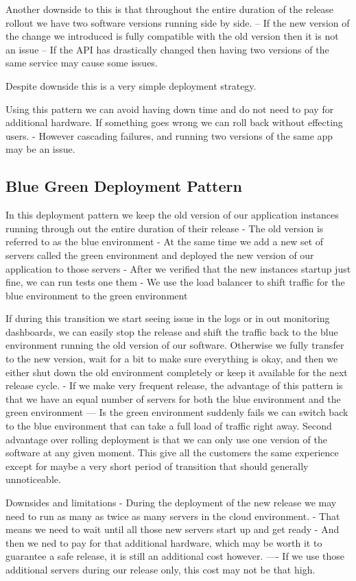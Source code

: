 Another downside to this is that throughout the entire duration of the release rollout we have two software versions running side by side.
-- If the new version of the change we introduced is fully compatible with the old version then it is not an issue
-- If the API has drastically changed then having two versions of the same service may cause some issues.

Despite downside this is a very simple deployment strategy.

Using this pattern we can avoid having down time and do not need to pay for additional hardware.
If something goes wrong we can roll back without effecting users.
- However cascading failures, and running two versions of the same app may be an issue.

\subsection{Blue Green Deployment Pattern}
In this deployment pattern we keep the old version of our application instances running through out the entire duration of their release
- The old version is referred to as the blue environment
- At the same time we add a new set of servers called the green environment and deployed the new version of our application to those servers
- After we verified that the new instances startup just fine, we can run tests one them
- We use the load balancer to shift traffic for the blue environment to the green environment

If during this transition we start seeing issue in the logs or in out monitoring dashboards, we can easily stop the release and shift the traffic back to the blue environment running the old version of our software.
Otherwise we fully transfer to the new version, wait for a bit to make sure everything is okay, and then we either shut down the old environment completely or keep it available for the next release cycle.
- If we make very frequent release, the advantage of this pattern is that we have an equal number of servers for both the blue environment and the green environment
--- Is the green environment suddenly fails we can switch back to the blue environment that can take a full load of traffic right away.
Second advantage over rolling deployment is that we can only use one version of the software at any given moment.
This give all the customers the same experience except for maybe a very short period of transition that should generally unnoticeable.

Downsides and limitations
- During the deployment of the new release we may need to run as many as twice as many servers in the cloud environment.
- That means we need to wait until all those new servers start up and get ready
- And then we ned to pay for that additional hardware, which may be worth it to guarantee a safe release, it is still an additional cost however.
---- If we use those additional servers during our release only, this cost may not be that high.

